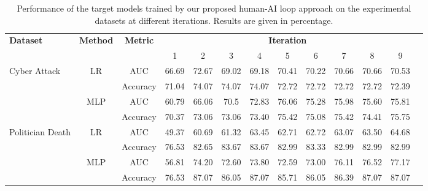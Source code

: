 \documentclass[letterpaper]{article}
\begin{document}
\begin{table}[btp]
\centering
\caption{Performance of the target models trained by our proposed human-AI loop approach on the experimental datasets at different iterations. Results are given in percentage. }
\label{tab:res}
\begin{tabular}{lcccccccccccc}
\toprule
\multicolumn{1}{l}{\multirow{2}{*}{\textbf{Dataset}}} & \multicolumn{1}{l}{\multirow{2}{*}{\textbf{Method}}} & \multirow{2}{*}{\textbf{Metric}} & \multicolumn{9}{c}{\textbf{Iteration}}                                         \\ \cline{4-12}
\multicolumn{1}{c}{} & \multicolumn{1}{c}{} & & 1     & 2     & 3     & 4     & 5     & 6     & 7     & 8     & 9     \\ \midrule
\multirow{4}{*}{Cyber Attack}                & \multirow{2}{*}{LR}
& AUC       & 66.69 & 72.67 & 69.02 & 69.18 & 70.41 & 70.22 & 70.66 & 70.66 &  70.53 \\ %
&
& Accuracy  & 71.04 & 74.07 & 74.07 & 74.07 & 72.72 & 72.72 & 72.72 & 72.72 & 72.39  \\ \cline{2-12}
                                             & \multirow{2}{*}{MLP}
& AUC       & 60.79 & 66.06 & 70.5 & 72.83 & 76.06 & 75.28 & 75.98 & 75.60 & 75.81      \\ %
                                             &
& Accuracy  & 70.37 & 73.06 & 73.06 & 73.40  & 75.42 & 75.08 & 75.42 & 74.41 & 75.75  \\ \hline
\multirow{4}{*}{Politician Death}           & \multirow{2}{*}{LR}
& AUC    & 49.37 & 60.69 & 61.32 & 63.45 & 62.71 & 62.72 & 63.07 & 63.50  & 64.68 \\ %
&
& Accuracy  & 76.53 & 82.65 & 83.67 & 83.67 & 82.99 & 83.33 & 82.99 & 82.99 & 82.99  \\ \cline{2-12}

                                             & \multirow{2}{*}{MLP}
& AUC       & 56.81 & 74.20 & 72.60 & 73.80 & 72.59 & 73.00 & 76.11  & 76.52 & 77.17   \\ %
                                             &
& Accuracy  & 76.53 & 87.07 & 86.05 & 87.07  & 85.71 & 86.05 & 86.39 & 87.07 & 87.07    \\ \bottomrule
\end{tabular}
\end{table}
\end{document}

